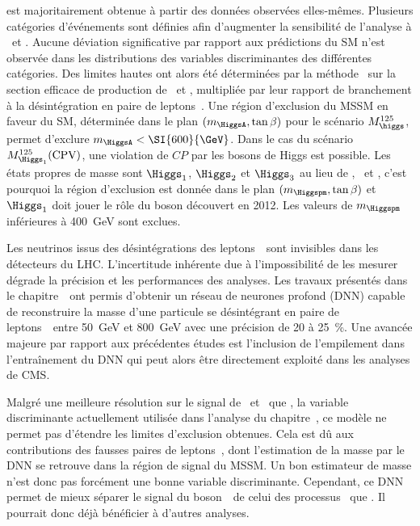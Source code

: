 est majoritairement obtenue à partir des données observées elles-mêmes.
Plusieurs catégories d'événements sont définies afin d'augmenter la sensibilité de l'analyse à \Higgs\ et \HiggsA.
Aucune déviation significative par rapport aux prédictions du SM n'est observée
dans
les distributions des variables discriminantes des différentes catégories.
Des limites hautes ont alors été déterminées par la méthode \CLS\ sur la section efficace de production de \Higgs\ et \HiggsA, multipliée par leur rapport de branchement à la désintégration en paire de leptons~\tau.
Une région d'exclusion du MSSM en faveur du SM,
déterminée dans le plan $(m_{\HiggsA},\tan\beta)$ pour le scénario $M_{\higgs}^{125}$,
permet d'exclure
$m_{\HiggsA} < \SI{600}{\GeV}$.
Dans le cas du scénario $M_{\Higgs_1}^{125}(\text{CPV})$,
une violation de $CP$ par les bosons de Higgs est possible.
Les états propres de masse sont
$\Higgs_1$, $\Higgs_2$ et $\Higgs_3$ au lieu de
\higgs, \Higgs\ et \HiggsA,
c'est pourquoi
la région d'exclusion est donnée dans le plan $(m_{\Higgspm},\tan\beta)$
et
$\Higgs_1$ doit jouer le rôle du boson découvert en 2012.
Les valeurs de $m_{\Higgspm}$ inférieures à \SI{400}{\GeV} sont exclues.
\par
Les neutrinos issus des désintégrations des leptons~\tau\
sont invisibles dans les détecteurs du LHC.
L'incertitude inhérente due à l'impossibilité de les mesurer
dégrade la précision et les performances des analyses.
Les travaux présentés dans le chapitre~\
ont permis d'obtenir un réseau de neurones profond (DNN)
capable de reconstruire la masse d'une particule se désintégrant en paire de leptons~\tau\
entre \SI{50}{\GeV} et \SI{800}{\GeV}
avec une précision de \num{20} à \SI{25}{\%}.
Une avancée majeure par rapport aux précédentes études est l'inclusion de l'empilement dans l'entraînement du DNN
qui peut alors être directement exploité dans les analyses de CMS.
\par
Malgré une meilleure résolution sur le signal de \Higgs\ et \HiggsA\ que \mTtot,
la variable discriminante actuellement utilisée dans l'analyse du chapitre~,
ce modèle ne permet pas d'étendre les limites d'exclusion obtenues.
Cela est dû aux contributions des fausses paires de leptons~\tau,
dont l'estimation de la masse par le DNN se retrouve dans la région de signal du MSSM.
Un bon estimateur de masse n'est donc pas forcément une bonne variable discriminante.
Cependant,
ce DNN permet de mieux
séparer le signal du boson~\Zboson\ de celui des processus \ttbar\
que \mTtot.
Il pourrait donc déjà bénéficier à d'autres analyses.
